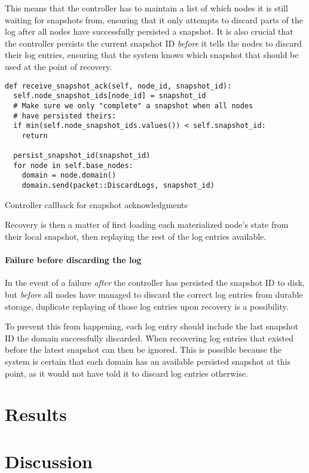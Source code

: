 \documentclass[b5paper]{report}
\begin{document}
This means that the controller has to maintain a list of which nodes it is still
waiting for snapshots from, ensuring that it only attempts to discard parts of
the log after all nodes have successfully persisted a snapshot. It is also
crucial that the controller persists the current snapshot ID \textit{before} it
tells the nodes to discard their log entries, ensuring that the system knows
which snapshot that should be used at the point of recovery.

\begin{listing}[H]
  \begin{verbatim}
def receive_snapshot_ack(self, node_id, snapshot_id):
  self.node_snapshot_ids[node_id] = snapshot_id
  # Make sure we only "complete" a snapshot when all nodes
  # have persisted theirs:
  if min(self.node_snapshot_ids.values()) < self.snapshot_id:
    return

  persist_snapshot_id(snapshot_id)
  for node in self.base_nodes:
    domain = node.domain()
    domain.send(packet::DiscardLogs, snapshot_id)
  \end{verbatim}
  \caption{Controller callback for snapshot acknowledgments}
\end{listing}

Recovery is then a matter of first loading each materialized node's state from
their local snapshot, then replaying the rest of the log entries available.

\subsubsection{Failure before discarding the log}
In the event of a failure \textit{after} the controller has persisted the
snapshot ID to disk, but \textit{before} all nodes have managed to discard the
correct log entries from durable storage, duplicate replaying of those log
entries upon recovery is a possibility.

To prevent this from happening, each log
entry should include the last snapshot ID the domain successfully discarded.
When recovering log entries that existed before the latest snapshot can then be
ignored. This is possible because the system is certain that each domain has an
available persisted snapshot at this point, as it would not have told it to
discard log entries otherwise.

\chapter{Results}
\chapter{Discussion}



\end{document}
